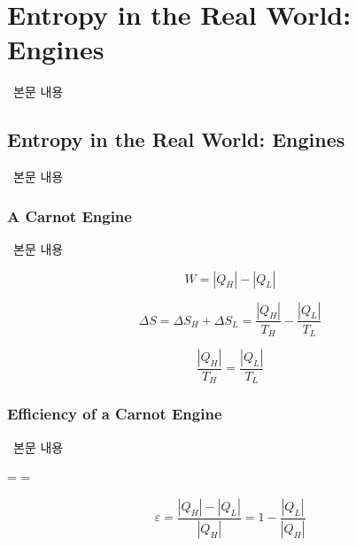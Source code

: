 \section{Entropy in the Real World: Engines}
%
\ 본문 내용

\subsection{Entropy in the Real World: Engines}
%
\ 본문 내용

\subsubsection{A Carnot Engine}
%
\ 본문 내용

\begin{equation} W = \left| Q_H \right| - \left| Q_L \right| \end{equation}

\begin{equation} \Delta S = \Delta S_H + \Delta S_L = \frac{ \left| Q_H \right| }{ T_H } - \frac{ \left| Q_L \right| }{ T_L } \end{equation}

\begin{equation} \frac{ \left| Q_H \right| }{ T_H } = \frac{ \left| Q_L \right| }{ T_L } \end{equation}

\subsubsection{Efficiency of a Carnot Engine}
%
\ 본문 내용

\begin{eqbox} \varepsilon =  =  ~~~~~ 
\label{eq:efficiency_of_any_engine} \end{eqbox}

\begin{equation} \varepsilon = \frac{\left| Q_H \right| - \left| Q_L \right|}{\left| Q_H \right|} = 1 - \frac{\left| Q_L \right|}{\left| Q_H \right|} \end{equation}

